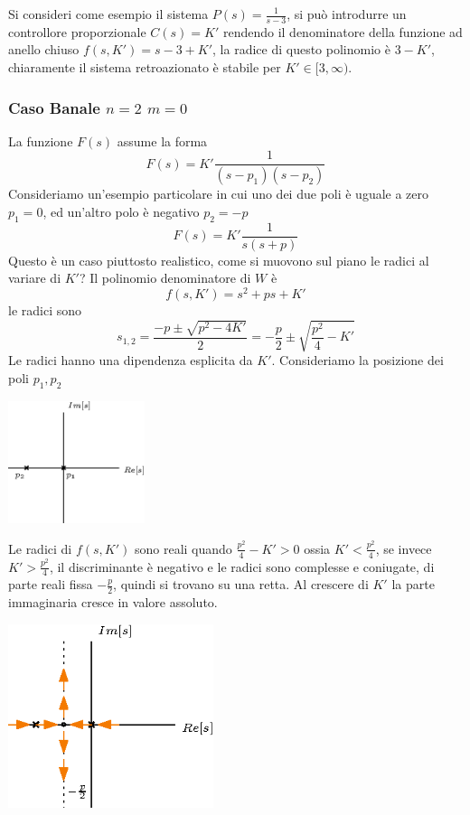 \documentclass[10pt, letterpaper]{report}
\begin{document}
Si consideri come esempio il sistema $P(s)=\frac{1}{s-3}$, si può introdurre un controllore proporzionale $C(s)=K'$ rendendo il denominatore della funzione ad anello chiuso $f(s,K')=s-3+K'$, la radice di questo polinomio è $3-K'$, chiaramente il sistema retroazionato è stabile per $K'\in[3,\infty)$.
\subsubsection{Caso Banale $n=2$ $m=0$}
La funzione $F(s)$ assume la forma 
$$ F(s)=K'\frac{1}{(s-p_1)(s-p_2)}$$
Consideriamo un'esempio particolare in cui uno dei due poli è uguale a zero $p_1=0$, ed un'altro polo è negativo $p_2=-p$
$$ F(s)=K'\frac{1}{s(s+p)}$$
Questo è un caso piuttosto realistico, come si muovono sul piano le radici al variare di $K'$? Il polinomio denominatore di $W$ è 
$$ f(s,K')=s^2+ps+K'$$
le radici sono 
$$ s_{1,2}=\frac{-p\pm \sqrt{p^2-4K'}}{2}=-\frac{p}{2}\pm \sqrt{\frac{p^2}{4}-K'}$$
Le radici hanno una dipendenza esplicita da $K'$. Consideriamo la posizione dei poli $p_1,p_2$
\begin{center}
    \includegraphics[width=0.3\textwidth ]{images/luogoRadiciN21.eps}
\end{center}
Le radici di $f(s,K')$ sono reali quando $\frac{p^2}{4}-K'>0$ ossia $K'<\frac{p^2}{4}$, se invece  $K'>\frac{p^2}{4}$, il discriminante è negativo e le radici sono complesse e coniugate, di parte reali fissa $-\frac{p}{2}$, quindi si trovano su una retta. Al crescere di $K'$ la parte immaginaria cresce in valore assoluto.
\begin{center}
    \includegraphics[width=0.45\textwidth ]{images/luogoRadiciN22.eps}
\end{center}
\end{document}

